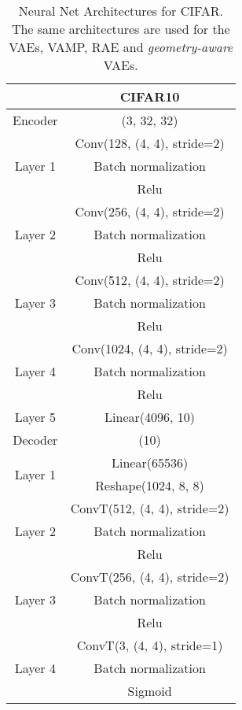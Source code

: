 \documentclass[10pt,journal,compsoc]{IEEEtran}
\begin{document}
\begin{table}[ht]
\caption{Neural Net Architectures for CIFAR. The same architectures are used for the VAEs, VAMP, RAE and \emph{geometry-aware} VAEs. }
\label{Tab: app cifar Architectures}
    \centering
    \scriptsize
    \begin{sc}
    \begin{tabular}{cc}
         &CIFAR10\\
    \hline
    \hline
    Encoder & (3, 32, 32) \\
    \hline
    \multirow{3}{*}{Layer 1} & Conv(128, (4, 4), stride=2)          \\
                             & Batch normalization  \\
                             & Relu   \\
    \hline
    \multirow{3}{*}{Layer 2} & Conv(256, (4, 4), stride=2)          \\
                             & Batch normalization  \\
                             & Relu \\
    \hline
    \multirow{3}{*}{Layer 3} & Conv(512, (4, 4), stride=2) \\
                             & Batch normalization         \\
                             & Relu                        \\
    \hline
    \multirow{3}{*}{Layer 4} & Conv(1024, (4, 4), stride=2) \\
                             & Batch normalization          \\
                             & Relu  \\
    \hline
    Layer 5               & Linear(4096, 10)\\
    \hline
    \hline
    Decoder                  & (10)                              \\
    \hline
    \multirow{2}{*}{Layer 1} & Linear(65536)                       \\
                             & Reshape(1024, 8, 8)                  \\
    \hline 
    \multirow{3}{*}{Layer 2} & ConvT(512, (4, 4), stride=2)         \\
                             & Batch normalization \\
                             & Relu\\
    \hline
    \multirow{3}{*}{Layer 3} & ConvT(256, (4, 4), stride=2)         \\
                             & Batch normalization \\
                             & Relu\\
    \hline
    \multirow{3}{*}{Layer 4} & ConvT(3, (4, 4), stride=1)         \\
                             & Batch normalization\\
                             & Sigmoid\\
    \end{tabular}
\end{sc}
\end{table}
\end{document}
